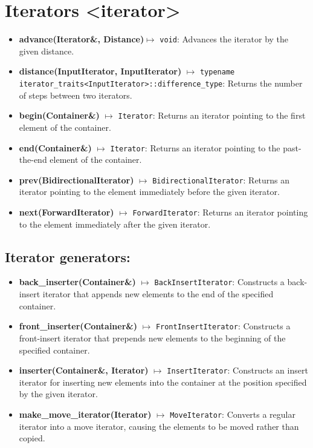 \documentclass{report}
\begin{document}
    \pagebreak \bigbreak \noindent
    \section{\LARGE Iterators <iterator>}
    \bigbreak \noindent 
    \begin{itemize}
        \item \textbf{advance(Iterator\&, Distance)}$\mapsto$ \texttt{void}: Advances the iterator by the given distance.
        \item \textbf{distance(InputIterator, InputIterator)} \(\mapsto\) \texttt{typename iterator\_traits<InputIterator>::difference\_type}: Returns the number of steps between two iterators.
        \item \textbf{begin(Container\&)} \(\mapsto\) \texttt{Iterator}: Returns an iterator pointing to the first element of the container.
        \item \textbf{end(Container\&)} \(\mapsto\) \texttt{Iterator}: Returns an iterator pointing to the past-the-end element of the container.
        \item \textbf{prev(BidirectionalIterator)} \(\mapsto\) \texttt{BidirectionalIterator}: Returns an iterator pointing to the element immediately before the given iterator.
        \item \textbf{next(ForwardIterator)} \(\mapsto\) \texttt{ForwardIterator}: Returns an iterator pointing to the element immediately after the given iterator.
    \end{itemize}


    \bigbreak \noindent 
    \subsection{Iterator generators:}
    \bigbreak \noindent 
    \begin{itemize}
        \item \textbf{back\_inserter(Container\&)} \(\mapsto\) \texttt{BackInsertIterator}: Constructs a back-insert iterator that appends new elements to the end of the specified container.
        \item \textbf{front\_inserter(Container\&)} \(\mapsto\) \texttt{FrontInsertIterator}: Constructs a front-insert iterator that prepends new elements to the beginning of the specified container.
        \item \textbf{inserter(Container\&, Iterator)} \(\mapsto\) \texttt{InsertIterator}: Constructs an insert iterator for inserting new elements into the container at the position specified by the given iterator.
        \item \textbf{make\_move\_iterator(Iterator)} \(\mapsto\) \texttt{MoveIterator}: Converts a regular iterator into a move iterator, causing the elements to be moved rather than copied.
    \end{itemize}
    
\end{document}
